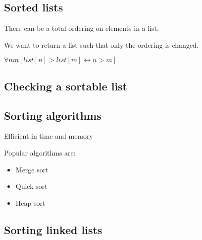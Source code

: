 
\subsection{Sorted lists}

There can be a total ordering on elements in a list.

We want to return a list such that only the ordering is changed.

\(\forall nm [list[n]>list[m] \leftrightarrow n>m]\)


\subsection{Checking a sortable list}
\subsection{Sorting algorithms}

Efficient in time and memory

Popular algorithms are:

\begin{itemize}
\item Merge sort
\item Quick sort
\item Heap sort
\end{itemize}


\subsection{Sorting linked lists}

